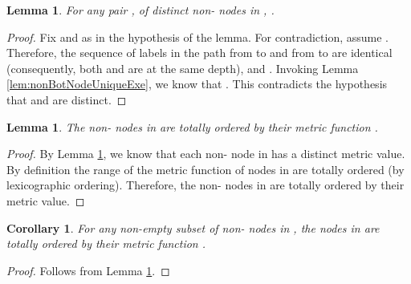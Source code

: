 \documentclass[11pt]{article}
\numberwithin{theorem}{section}
\newtheorem{lemma}[theorem]{Lemma}
\newtheorem{corollary}[theorem]{Corollary}
\begin{document}
\begin{lemma}\label{lem:distinctMetricValueDistinctNodes}
For any pair ,  of distinct non- nodes in , .
\end{lemma}
 \begin{proof}
Fix  and  as in the hypothesis of the lemma. For contradiction, assume . Therefore, the sequence of labels in the path from  to  and from  to  are identical (consequently, both  and  are at the same depth), and . Invoking Lemma \ref{lem:nonBotNodeUniqueExe}, we know that . This contradicts the hypothesis that  and  are distinct.
 \end{proof}



\begin{lemma}\label{lem:totallyOrderedNodesInTree}
The non- nodes in  are totally ordered by their metric function .
\end{lemma}
\begin{proof}
By Lemma \ref{lem:distinctMetricValueDistinctNodes}, we know that each non- node in  has a distinct metric value. By definition the range of the metric function  of nodes in  are totally ordered (by lexicographic ordering).
Therefore, the non- nodes in  are totally ordered by their metric value.
\end{proof}

\begin{corollary}\label{cor:totallyOrderedNodesInSubset}
For any non-empty subset  of non- nodes in , the nodes in  are totally ordered by their metric function .
\end{corollary}
\begin{proof}
Follows from Lemma \ref{lem:totallyOrderedNodesInTree}.
\end{proof}
\end{document}
